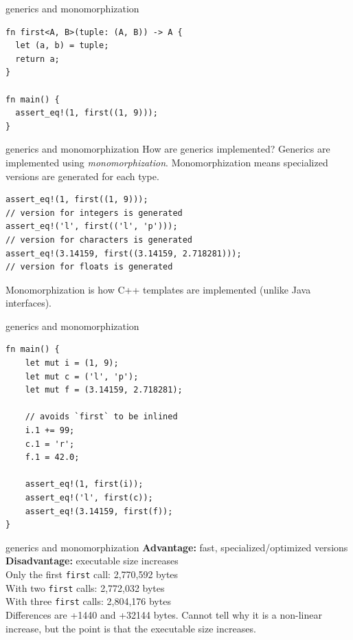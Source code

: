 \documentclass{beamer}
\begin{document}
\begin{frame}[fragile]{generics and monomorphization}
  \begin{verbatim}
fn first<A, B>(tuple: (A, B)) -> A {
  let (a, b) = tuple;
  return a;
}

fn main() {
  assert_eq!(1, first((1, 9)));
}
  \end{verbatim}  
\end{frame}

\begin{frame}[fragile]{generics and monomorphization}
  How are generics implemented?
  Generics are implemented using \emph{monomorphization}.
  Monomorphization means specialized versions are generated for each type.

  \begin{verbatim}
assert_eq!(1, first((1, 9)));
// version for integers is generated
assert_eq!('l', first(('l', 'p')));
// version for characters is generated
assert_eq!(3.14159, first((3.14159, 2.718281)));
// version for floats is generated
  \end{verbatim}

  Monomorphization is how C++ templates are implemented (unlike Java interfaces).
\end{frame}

\begin{frame}[fragile]{generics and monomorphization}
  \begin{verbatim}
fn main() {
    let mut i = (1, 9);
    let mut c = ('l', 'p');
    let mut f = (3.14159, 2.718281);

    // avoids `first` to be inlined
    i.1 += 99;
    c.1 = 'r';
    f.1 = 42.0;

    assert_eq!(1, first(i));
    assert_eq!('l', first(c));
    assert_eq!(3.14159, first(f));
}
  \end{verbatim}  
\end{frame}

\begin{frame}[fragile]{generics and monomorphization}
  \textbf{Advantage:} fast, specialized/optimized versions \\
  \textbf{Disadvantage:} executable size increases \\[5pt]

  Only the first \texttt{first} call: 2,770,592 bytes \\
  With two \texttt{first} calls: 2,772,032 bytes \\
  With three \texttt{first} calls: 2,804,176 bytes \\[5pt]

  Differences are +1440 and +32144 bytes. Cannot tell why it is a non-linear increase, but the point is that the executable size increases.
\end{frame}
\end{document}
